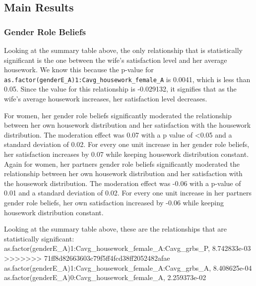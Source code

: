 \documentclass[
  man,floatsintext]{apa6}
\begin{document}
\hypertarget{main-results}{%
\subsection{Main Results}\label{main-results}}

\hypertarget{gender-role-beliefs}{%
\subsubsection{Gender Role Beliefs}\label{gender-role-beliefs}}

Looking at the summary table above, the only relationship that is statistically significant is the one between the wife's satisfaction level and her average housework. We know this because the p-value for \texttt{as.factor(genderE\_A)1:Cavg\_housework\_female\_A} is 0.0041, which is less than 0.05. Since the value for this relationship is -0.029132, it signifies that as the wife's average housework increases, her satisfaction level decreases.

For women, her gender role beliefs significantly moderated the relationship between her own housework distribution and her satisfaction with the housework distribution. The moderation effect was 0.07 with a p value of \textless0.05 and a standard deviation of 0.02. For every one unit increase in her gender role beliefs, her satisfaction increases by 0.07 while keeping housework distribution constant. Again for women, her partners gender role beliefs significantly moderated the relationship between her own housework distribution and her satisfaction with the housework distribution. The moderation effect was -0.06 with a p-value of 0.01 and a standard deviation of 0.02. For every one unit increase in her partners gender role beliefs, her own satisfaction increased by -0.06 while keeping housework distribution constant.

Looking at the summary table above, these are the relationships that are statistically significant:
as.factor(genderE\_A)1:Cavg\_housework\_female\_A:Cavg\_grbs\_P, 8.742833e-03
>>>>>>> 71ff8d82663603c79f5ff4fcd38ff2052482afae
as.factor(genderE\_A)1:Cavg\_housework\_female\_A:Cavg\_grbs\_A, 8.408625e-04
as.factor(genderE\_A)0:Cavg\_housework\_female\_A, 2.259373e-02
\end{document}
